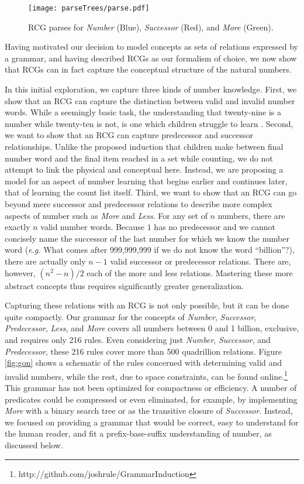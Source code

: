 \documentclass[10pt,letterpaper]{article}
\begin{document}
\begin{figure}[t]
  \begin{centering}
    \texttt{[image: parseTrees/parse.pdf]}
    \caption{RCG parses for \emph{Number} (Blue), \emph{Successor} (Red), and \emph{More} (Green).}
    \label{fig:parse}
  \end{centering}
\end{figure}

Having motivated our decision to model concepts as sets of relations
expressed by a grammar, and having described RCGs as our formalism of
choice, we now show that RCGs can in fact capture the conceptual
structure of the natural numbers.

In this initial exploration, we capture three kinds of number
knowledge. First, we show that an RCG can capture the distinction
between valid and invalid number words. While a seemingly basic task,
the understanding that twenty-nine is a number while twenty-ten is
not, is one which children struggle to learn \citep{FusRicBriar1982}.
Second, we want to show that an RCG can capture predecessor and
successor relationships. Unlike the proposed induction that children
make between final number word and the final item reached in a set
while counting, we do not attempt to link the physical and conceptual
here. Instead, we are proposing a model for an aspect of number
learning that begins earlier and continues later, that of learning the
count list itself. Third, we want to show that an RCG can go beyond
mere successor and predecessor relations to describe more complex
aspects of number such as \emph{More} and \emph{Less}. For any set of
$n$ numbers, there are exactly $n$ valid number words. Because $1$ has
no predecessor and we cannot concisely name the successor of the last
number for which we know the number word ({\it e.g.} What comes after
999,999,999 if we do not know the word ``billion''?), there are
actually only $n-1$ valid successor or predecessor relations. There
are, however, $(n^2-n)/2$ each of the more and less relations.
Mastering these more abstract concepts thus requires significantly
greater generalization.

Capturing these relations with an RCG is not only possible, but it can
be done quite compactly. Our grammar for the concepts of
\emph{Number}, \emph{Successor}, \emph{Predecessor}, \emph{Less}, and
\emph{More} covers all numbers between 0 and 1 billion, exclusive, and
requires only 216 rules. Even considering just \emph{Number},
\emph{Successor}, and \emph{Predecessor}, these 216 rules cover more
than 500 quadrillion relations. Figure \ref{fig:gon} shows a schematic
of the rules concerned with determining valid and invalid numbers,
while the rest, due to space constraints, can be found
online.\footnote{http://github.com/joshrule/GrammarInduction} This
grammar has not been optimized for compactness or efficiency. A number
of predicates could be compressed or even eliminated, for example, by
implementing \emph{More} with a binary search tree or as the
transitive closure of \emph{Successor}. Instead, we focused on
providing a grammar that would be correct, easy to understand for the
human reader, and fit a prefix-base-suffix understanding of number, as
discussed below.
\end{document}
